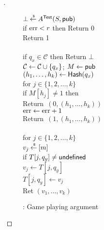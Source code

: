 \begin{proof}[]
\begin{figure}
{{$\bot {\:\stackrel{{\scriptscriptstyle \hspace{0.2em}\$}} {\leftarrow}\:} A^{\mathsf{Test}}(S,{\sf pub})$\\
if $\mathrm{err}  < r$ then Return 0\\
Return 1\\ 
%
\\
if $q_x \in \mathcal{C}$ then Return $\bot$\\
${\cal C} \gets {\cal C} \cup \{q_x\}$; $M \gets{\sf pub}$\\
$(h_1, \ldots, h_{k}) \gets \mathsf{Hash}(q_x)$\\
for $j \in \{1,2,\ldots,k\}$\\
\nudge if $M[h_j] \neq 1$ then \\
\nudge \nudge Return~$(0, (h_1, \ldots, h_{k}) )$\\
$\mathrm{err} \gets \mathrm{err} +1$\\
Return~$(1, (h_1, \ldots, h_{k}) )$\\
%
\\
for $j \in \{1,2,\ldots,k\}$\\
\nudge $v_j {\:\stackrel{{\scriptscriptstyle \hspace{0.2em}\$}} {\leftarrow}\:} [m]$\\
\nudge if $T[j,q_y] \neq \mathsf{undefined}$\\
\nudge \nudge $v_j \gets T[j,q_y]$\\
\nudge $T[j,q_y] \gets v_j$\\
Ret $\left(v_1,\ldots,v_k\right)$
}
}
\caption{: Game playing argument}\label{fig:3TGame}
\end{figure}
\begin{figure}
\end{figure}
\end{proof}
